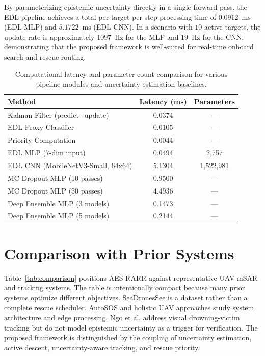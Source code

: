 \documentclass[runningheads]{llncs}
\newcommand{\aes}{AES-RARR}
\begin{document}
By parameterizing epistemic uncertainty directly in a single forward pass, the EDL pipeline achieves a total per-target per-step processing time of $0.0912$~ms (EDL MLP) and $5.1722$~ms (EDL CNN). In a scenario with $10$ active targets, the update rate is approximately $1097$~Hz for the MLP and $19$~Hz for the CNN, demonstrating that the proposed framework is well-suited for real-time onboard search and rescue routing.

\begin{table}[t]
\centering
\caption{Computational latency and parameter count comparison for various pipeline modules and uncertainty estimation baselines.}
\label{tab:runtime}
\small
\setlength{\tabcolsep}{6pt}
\renewcommand{\arraystretch}{1.1}
\begin{tabularx}{\textwidth}{YCC}
\toprule
\textbf{Method} & \textbf{Latency (ms)} & \textbf{Parameters} \\
\midrule
Kalman Filter (predict+update) & 0.0374 & --- \\
EDL Proxy Classifier & 0.0105 & --- \\
Priority Computation & 0.0044 & --- \\
\midrule
EDL MLP (7-dim input) & 0.0494 & 2,757 \\
EDL CNN (MobileNetV3-Small, 64x64) & 5.1304 & 1,522,981 \\
\midrule
MC Dropout MLP (10 passes) & 0.9500 & --- \\
MC Dropout MLP (50 passes) & 4.4936 & --- \\
Deep Ensemble MLP (3 models) & 0.1473 & --- \\
Deep Ensemble MLP (5 models) & 0.2144 & --- \\
\bottomrule
\end{tabularx}
\end{table}

\section{Comparison with Prior Systems}

Table~\ref{tab:comparison} positions \aes{} against representative UAV mSAR and tracking systems. The table is intentionally compact because many prior systems optimize different objectives. SeaDronesSee is a dataset rather than a complete rescue scheduler. AutoSOS and holistic UAV approaches study system architecture and edge processing. Ngo et al. address visual drowning-victim tracking but do not model epistemic uncertainty as a trigger for verification. The proposed framework is distinguished by the coupling of uncertainty estimation, active descent, uncertainty-aware tracking, and rescue priority.
\end{document}
